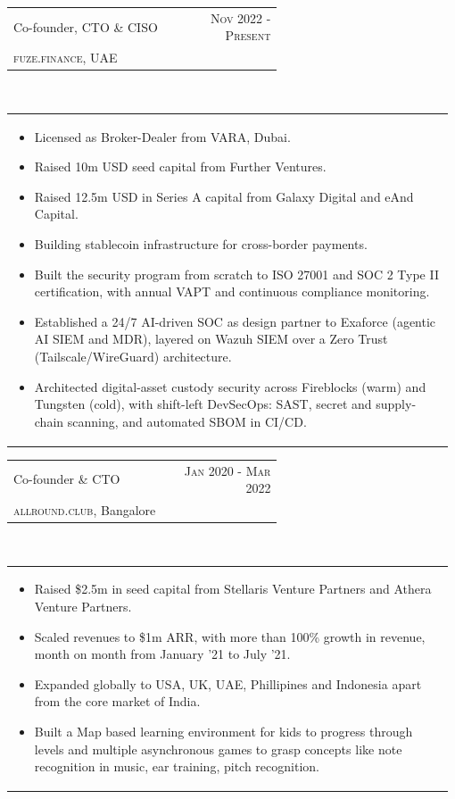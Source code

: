 \documentclass[a4paper]{article} %
\newcommand{\verticalspacing}{-0.25cm}
\newcommand{\bulletspace}{0.7cm}
\newcommand{\projectheadspacing}{6.9cm}
\newcommand{\cproject}[5]{%
    \begin{tabular}{p{0.60\linewidth}r}
        \textcolor{NavyBlue}{\small #2} & \multicolumn{1}{m{ \projectheadspacing{} }}{\raggedleft \small {\textsc{#1}}}\\
        \small {#3} & \small {#4}
    \end{tabular}\\
    \begin{tabular}{p{0.98\linewidth}}
    \vspace{-0.3cm}
        \small{#5}
    \end{tabular}
    \vspace{\verticalspacing{}}
}
\begin{document}
\cproject
      {Nov 2022 - Present}
      {Co-founder, CTO \& CISO}
      {\textsc{fuze.finance}, UAE}
      {}
      {%
        \begin{itemize}[leftmargin=\bulletspace{}]
            \item Licensed as Broker-Dealer from \textsc{VARA}, Dubai.
            \item Raised 10m USD seed capital from Further Ventures.
            \item Raised 12.5m USD in Series A capital from Galaxy Digital and eAnd Capital.
            \item Building stablecoin infrastructure for cross-border payments.
            \item Built the security program from scratch to ISO 27001 and SOC 2 Type II
                certification, with annual VAPT and continuous compliance monitoring.
            \item Established a 24/7 AI-driven SOC as design partner to Exaforce (agentic
                AI SIEM and MDR), layered on Wazuh SIEM over a Zero Trust
                (Tailscale/WireGuard) architecture.
            \item Architected digital-asset custody security across Fireblocks (warm) and
                Tungsten (cold), with shift-left DevSecOps: SAST, secret and
                supply-chain scanning, and automated SBOM in CI/CD.
        \end{itemize}
      }

\cproject
      {Jan 2020 - Mar 2022}
      {Co-founder \& CTO}
      {\textsc{allround.club}, Bangalore}
      {}
      {%
        \begin{itemize}[leftmargin=\bulletspace{}]
            \item Raised \$2.5m in seed capital from Stellaris Venture Partners and Athera Venture Partners.
            \item Scaled revenues to \$1m ARR, with more than 100\% growth in revenue, month on month from January '21
                to July '21.
            \item Expanded globally to USA, UK, UAE, Phillipines and Indonesia apart from the core market of India.
            \item Built a Map based learning environment for kids to progress through levels and multiple asynchronous
                games to grasp concepts like note recognition in music, ear training, pitch recognition.
        \end{itemize}
      }
\end{document}
